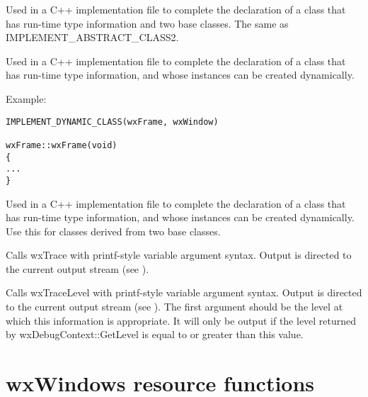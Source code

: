 
Used in a C++ implementation file to complete the declaration of a
class that has run-time type information and two base classes. The
same as IMPLEMENT\_ABSTRACT\_CLASS2.



Used in a C++ implementation file to complete the declaration of
a class that has run-time type information, and whose instances
can be created dynamically.

Example:

\begin{verbatim}
IMPLEMENT_DYNAMIC_CLASS(wxFrame, wxWindow)

wxFrame::wxFrame(void)
{
...
}
\end{verbatim}



Used in a C++ implementation file to complete the declaration of
a class that has run-time type information, and whose instances
can be created dynamically. Use this for classes derived from two
base classes.

\label{trace}


Calls wxTrace with printf-style variable argument syntax. Output
is directed to the current output stream (see ).

\label{tracelevel}


Calls wxTraceLevel with printf-style variable argument syntax. Output
is directed to the current output stream (see ).
The first argument should be the level at which this information is appropriate.
It will only be output if the level returned by wxDebugContext::GetLevel is equal to or greater than
this value.

\section{wxWindows resource functions}\label{resourcefuncs}

